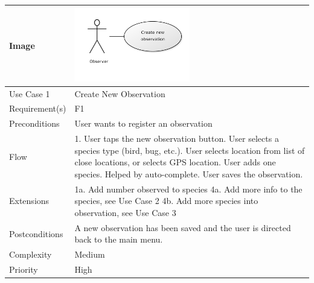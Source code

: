\begin{tabular}[t]{|l|p{}|}\hline
	Image&\includegraphics[width=0.5\textwidth]{reqspec/uc/cno.png} \\\hline
	Use Case 1&Create New Observation\\\hline
	Requirement(s)&F1\\\hline
	Preconditions&User wants to register an observation\\\hline
	Flow&1. User taps the new observation button\newline
	2. User selects a species type (bird, bug, etc.)\newline
	3. User selects location from list of close locations, or selects GPS location\newline
	4. User adds one species. Helped by auto-complete\newline
	5. User saves the observation.\\\hline
	Extensions& 1a. Add number observed to species\newline
	4a. Add more info to the species, see Use Case 2\newline
	4b. Add more species into observation, see Use Case 3\\\hline
	Postconditions&A new observation has been saved and the user is directed back to the main menu.\\\hline
	Complexity&Medium\\\hline
	Priority&High\\\hline
\end{tabular}

\hspace{4em}

